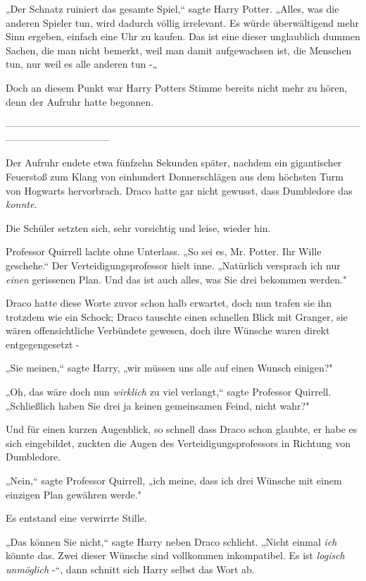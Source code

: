 {„Der Schnatz ruiniert das gesamte Spiel,“ sagte Harry Potter. „Alles, was die anderen Spieler tun, wird dadurch völlig irrelevant. Es würde überwältigend mehr Sinn ergeben, einfach eine Uhr zu kaufen. Das ist eine dieser unglaublich dummen Sachen, die man nicht bemerkt, weil man damit aufgewachsen ist, die Menschen tun, nur weil es alle anderen tun -„

Doch an diesem Punkt war Harry Potters Stimme bereits nicht mehr zu hören, denn der Aufruhr hatte begonnen.

--------------------------------------------------------------------------------------------------------------------------------------------

\hfill\break Der Aufruhr endete etwa fünfzehn Sekunden später, nachdem ein gigantischer Feuerstoß zum Klang von einhundert Donnerschlägen aus dem höchsten Turm von Hogwarts hervorbrach. Draco hatte gar nicht gewusst, dass Dumbledore das \emph{konnte}.

Die Schüler setzten sich, sehr vorsichtig und leise, wieder hin.

Professor Quirrell lachte ohne Unterlass. „So sei es, Mr. Potter. Ihr Wille geschehe.“ Der Verteidigungsprofessor hielt inne. „Natürlich versprach ich nur \emph{einen} gerissenen Plan. Und das ist auch alles, was Sie drei bekommen werden."

Draco hatte diese Worte zuvor schon halb erwartet, doch nun trafen sie ihn trotzdem wie ein Schock; Draco tauschte einen schnellen Blick mit Granger, sie wären offensichtliche Verbündete gewesen, doch ihre Wünsche waren direkt entgegengesetzt -

„Sie meinen,“ sagte Harry, „wir müssen uns alle auf einen Wunsch einigen?"

„Oh, das wäre doch nun \emph{wirklich} zu viel verlangt,“ sagte Professor Quirrell. „Schließlich haben Sie drei ja keinen gemeinsamen Feind, nicht wahr?"

Und für einen kurzen Augenblick, so schnell dass Draco schon glaubte, er habe es sich eingebildet, zuckten die Augen des Verteidigungsprofessors in Richtung von Dumbledore.

„Nein,“ sagte Professor Quirrell, „ich meine, dass ich drei Wünsche mit einem einzigen Plan gewähren werde."

Es entstand eine verwirrte Stille.

„Das können Sie nicht,“ sagte Harry neben Draco schlicht. „Nicht einmal \emph{ich} könnte das. Zwei dieser Wünsche sind vollkommen inkompatibel. Es ist \emph{logisch unmöglich} -“, dann schnitt sich Harry selbst das Wort ab.

}
